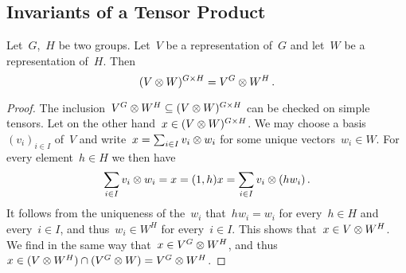 \documentclass[a4paper,11pt]{scrartcl}
\begin{document}
\subsection{Invariants of a Tensor Product}

\begin{lemma}
  \label{invariants of tensor product}
  Let~$G$,~$H$ be two groups.
  Let~$V$ be a representation of~$G$ and let~$W$ be a representation of~$H$.
  Then
  \[
    (V \otimes W)^{G \times H}
    =
    V^G \otimes W^H \,.
  \]
\end{lemma}

\begin{proof}
  The inclusion~$V^G \otimes W^H \subseteq (V \otimes W)^{G \times H}$ can be checked on simple tensors.
  Let on the other hand~$x \in (V \otimes W)^{G \times H}$.
  We may choose a basis~$(v_i)_{i \in I}$ of~$V$ and write~$x = \sum_{i \in I} v_i \otimes w_i$ for some unique vectors~$w_i \in W$.
  For every element~$h \in H$ we then have
  \[
    \sum_{i \in I} v_i \otimes w_i
    =
    x
    =
    (1,h) x
    =
    \sum_{i \in I} v_i \otimes (h w_i) \,.
  \]
  It follows from the uniqueness of the~$w_i$ that~$h w_i = w_i$ for every~$h \in H$ and every~$i \in I$, and thus~$w_i \in W^H$ for every~$i \in I$.
  This shows that~$x \in V \otimes W^H$.
  We find in the same way that~$x \in V^G \otimes W^H$, and thus~$x \in (V \otimes W^H) \cap (V^G \otimes W) = V^G \otimes W^H$.
\end{proof}





\printbibliography
\end{document}
